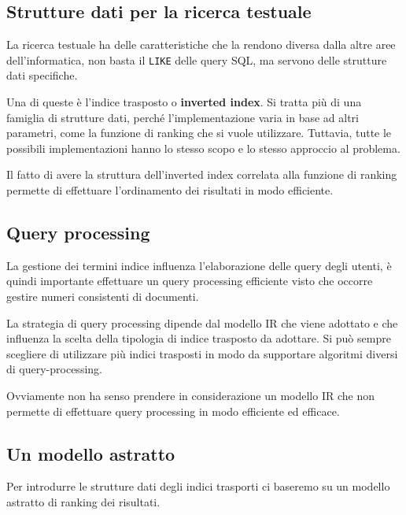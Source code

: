 


\subsection{Strutture dati per la ricerca testuale}

La ricerca testuale ha delle caratteristiche che la rendono diversa dalla altre aree dell'informatica, non basta il \texttt{LIKE} delle query SQL, ma servono delle strutture dati specifiche.

Una di queste è l'indice trasposto o \textbf{inverted index}. Si tratta più di una famiglia di strutture dati, perché l'implementazione varia in base ad altri parametri, come la funzione di ranking che si vuole utilizzare. Tuttavia, tutte le possibili implementazioni hanno lo stesso scopo e lo stesso approccio al problema.

Il fatto di avere la struttura dell'inverted index correlata alla funzione di ranking permette di effettuare l'ordinamento dei risultati in modo efficiente.

\subsection{Query processing}

La gestione dei termini indice influenza l'elaborazione delle query degli utenti, è quindi importante effettuare un query processing efficiente visto che occorre gestire numeri consistenti di documenti.

La strategia di query processing dipende dal modello IR che viene adottato e che influenza la scelta della tipologia di indice trasposto da adottare. 
Si può sempre scegliere di utilizzare più indici trasposti in modo da supportare algoritmi diversi di query-processing.

Ovviamente non ha senso prendere in considerazione un modello IR che non permette di effettuare query processing in modo efficiente ed efficace.

\subsection{Un modello astratto}

Per introdurre le strutture dati degli indici trasporti ci baseremo su un modello astratto di ranking dei risultati.

